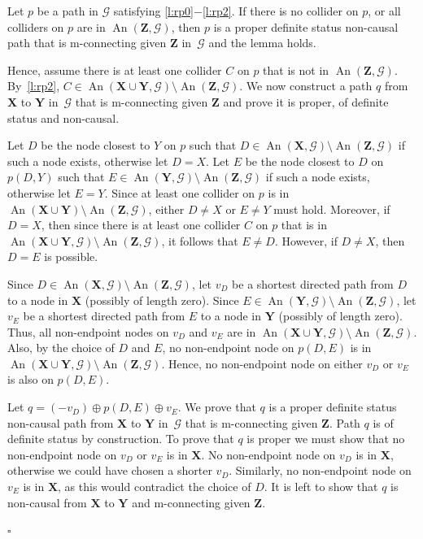 \documentclass[11pt,a4paper]{article}
\newenvironment{proofof}[1][]{\begin{trivlist}
   \item[\hskip \labelsep {\bfseries Proof of #1.}]}{\hfill{}$\square$\end{trivlist}}
\DeclareMathOperator{\An}{An}
\newcommand{\g}[1][G]{\mathcal{#1}}
\begin{document}
\begin{proofof}[Lemma~\ref{lemma:rich prime}]
Let $p$ be a path in $\g$ satisfying \ref{l:rp0}$-$\ref{l:rp2}.
If there is no collider on $p$, or all colliders on $p$ are in $\An(\mathbf{Z}, \g)$, then $p$ is a proper definite status non-causal path that is m-connecting given $\mathbf{Z}$ in~$\g$ and the lemma holds.

Hence, assume there is at least one collider $C$ on $p$ that is not in $\An(\mathbf{Z},\g)$. By~\ref{l:rp2}, $ C \in \An(\mathbf{X} \cup \mathbf{Y},\g) \setminus \An( \mathbf{Z}, \g) $.
We now construct a path $q$ from $\mathbf{X}$ to $\mathbf{Y}$ in~$\g$ that is m-connecting given $\mathbf{Z}$ and prove it is proper, of definite status and non-causal.

Let $D$ be the node closest to $Y$ on $p$ such that $D \in \An(\mathbf{X},\g) \setminus \An(\mathbf{Z},\g)$ if such a node exists, otherwise let $D=X$.
Let $E$ be the node closest to $D$ on $p(D,Y)$ such that $E \in \An(\mathbf{Y}, \g) \setminus \An(\mathbf{Z},\g)$ if such a node exists, otherwise let $E=Y$.
Since at least one collider on $p$ is in $\An(\mathbf{X} \cup \mathbf{Y}) \setminus \An(\mathbf{Z},\g)$, either $D \neq X$ or $E \neq Y$ must hold. Moreover, if $D=X$, then since there is at least one collider $C$ on $p$ that is in $ \An(\mathbf{X} \cup \mathbf{Y},\g) \setminus \An( \mathbf{Z}, \g) $, it follows that $E \neq D$. However, if $D \neq X$, then $D=E$ is possible.

Since $D \in \An(\mathbf{X},\g) \setminus \An(\mathbf{Z},\g)$, let $v_D$ be a shortest directed path from $D$ to a node in $\mathbf{X}$ (possibly of length zero). Since $E \in \An(\mathbf{Y}, \g)\setminus \An(\mathbf{Z},\g)$, let $v_{E}$ be a shortest directed path from $E$ to a node in $\mathbf{Y}$ (possibly of length zero). Thus, all non-endpoint nodes on $v_D$ and $v_E$ are in $\An(\mathbf{X} \cup \mathbf{Y}, \g) \setminus \An(\mathbf{Z},\g)$. Also, by the choice of $D$ and $E$, no non-endpoint node on $p(D,E)$ is in $\An(\mathbf{X} \cup \mathbf{Y},\g) \setminus \An(\mathbf{Z},\g)$.
Hence, no non-endpoint node on either $v_D$ or $v_E$ is also on $p(D,E)$.

Let $q = (-v_{D}) \oplus p(D,E) \oplus v_{E}$. We prove that $q$ is a proper definite status non-causal path from $\mathbf{X}$ to $\mathbf{Y}$ in~$\g$ that is m-connecting given $\mathbf{Z}$. Path $q$ is of definite status by construction. To prove that $q$ is proper we must show that no non-endpoint node on $v_D$ or $v_E$ is in $\mathbf{X}$. No non-endpoint node on $v_D$ is in $\mathbf{X}$, otherwise we could have chosen a shorter $v_D$. Similarly, no non-endpoint node on $v_E$ is in $\mathbf{X}$, as this would contradict the choice of $D$. It is left to show that $q$ is non-causal from $\mathbf{X}$ to $\mathbf{Y}$ and m-connecting given $\mathbf{Z}$.


\end{proofof}
\end{document}
